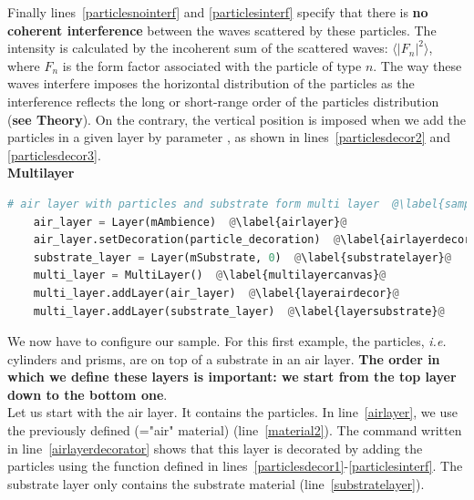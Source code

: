\noindent Finally lines~\ref{particlesnointerf} and
\ref{particlesinterf} specify that there is \textbf{no coherent interference} between
the waves scattered by these particles. The intensity is calculated by
the incoherent sum of the scattered waves: $\langle |F_n|^2\rangle$,
where $F_n$ is the form factor associated with the particle of type $n$.  The way these waves
interfere imposes the horizontal distribution of
the particles as
the interference reflects the long or short-range order of the
particles distribution (\textbf{see Theory}). On the contrary, the vertical position is
imposed when we add the particles in a given layer by parameter , as shown in lines~\ref{particlesdecor2} and \ref{particlesdecor3}. \\

\noindent \textbf{Multilayer}\\
  
\begin{lstlisting}[language=python, style=eclipseboxed,name=ex1,nolol]
    # air layer with particles and substrate form multi layer  @\label{sampleassembling}@
    air_layer = Layer(mAmbience)  @\label{airlayer}@
    air_layer.setDecoration(particle_decoration)  @\label{airlayerdecorator}@
    substrate_layer = Layer(mSubstrate, 0)  @\label{substratelayer}@
    multi_layer = MultiLayer()  @\label{multilayercanvas}@
    multi_layer.addLayer(air_layer)  @\label{layerairdecor}@
    multi_layer.addLayer(substrate_layer)  @\label{layersubstrate}@
\end{lstlisting}

\noindent We now have to configure our sample. For this first example,
the particles, \textit{i.e.} cylinders and prisms, are on top of a substrate in an
air layer. \textbf{The order in which we define these layers is important: we
start from the top layer down to the bottom one}.\\

\noindent Let us start with the air layer. It contains the particles. In
line~\ref{airlayer}, we use the previously defined 
(="air" material) (line~\ref{material2}). The command written in line~\ref{airlayerdecorator} shows that this layer is decorated by adding the
particles using the function  defined in
lines~\ref{particlesdecor1}-\ref{particlesinterf}. The substrate layer
only contains the substrate material (line~\ref{substratelayer}).\\%
 
